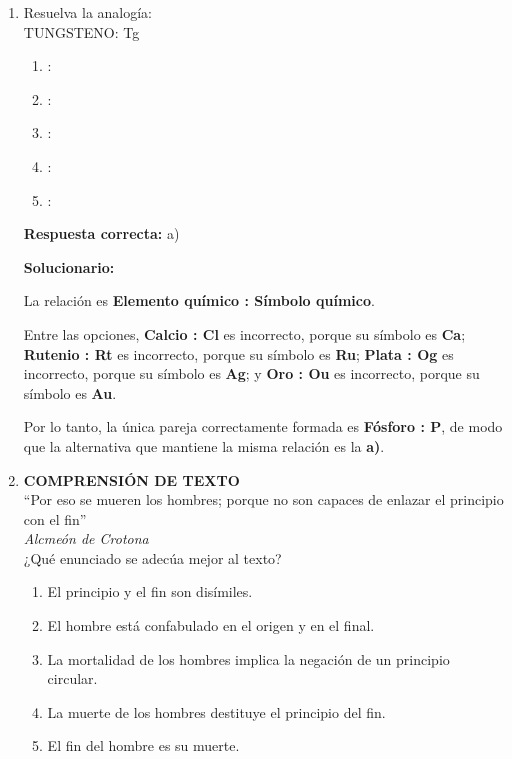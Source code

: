\begin{enumerate}[resume]
\item Resuelva la analogía:\\
TUNGSTENO: Tg
\begin{enumerate}[label=\alph*)]
	\item {} : 
	\item {}  : 
	\item {} : 
	\item {}   : 
	\item {}     : 
\end{enumerate}


\textbf{Respuesta correcta:} a)

\vspace{2mm}
\textbf{Solucionario:}

La relación es \textbf{Elemento químico : Símbolo químico}.

Entre las opciones, \textbf{Calcio : Cl} es incorrecto, porque su símbolo es \textbf{Ca}; \textbf{Rutenio : Rt} es incorrecto, porque su símbolo es \textbf{Ru}; \textbf{Plata : Og} es incorrecto, porque su símbolo es \textbf{Ag}; y \textbf{Oro : Ou} es incorrecto, porque su símbolo es \textbf{Au}.

Por lo tanto, la única pareja correctamente formada es \textbf{Fósforo : P}, de modo que la alternativa que mantiene la misma relación es la \textbf{a)}.

\item \textbf{COMPRENSIÓN DE TEXTO}\\
``Por eso se mueren los hombres; porque no son capaces de enlazar el principio con el fin''\\
\hfill \textit{Alcmeón de Crotona}\\[1mm]
¿Qué enunciado se adecúa mejor al texto?
\begin{enumerate}[label=\alph*)]
	\item El principio y el fin son disímiles.
	\item El hombre está confabulado en el origen y en el final.
	\item La mortalidad de los hombres implica la negación de un principio circular.
	\item La muerte de los hombres destituye el principio del fin.
	\item El fin del hombre es su muerte.
\end{enumerate}


\end{enumerate}
